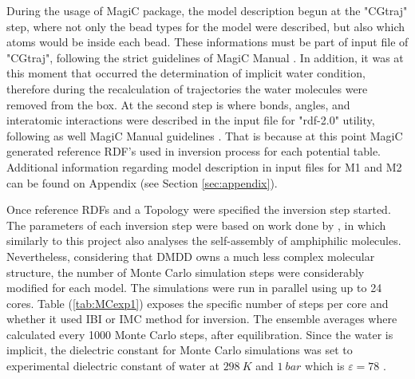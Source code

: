 \documentclass[10pt,a4paper,twoside]{article}
\begin{document}
 During the usage of MagiC package, the model description begun at the "CGtraj" step, where  not only the bead types for the model were described, but also which atoms would be inside each bead. These informations must be part of input file of "CGtraj", following the strict guidelines of MagiC Manual \cite{magicmanu}. In addition, it was at this moment that occurred the determination of implicit water condition, therefore during the recalculation of trajectories the water molecules were removed from the box. At the second step is where bonds, angles, and interatomic interactions were described in the input file for "rdf-2.0" utility, following as well MagiC Manual guidelines \cite{magicmanu}.  That is because at this point MagiC generated reference RDF's used in inversion process for each potential table. Additional information regarding model description in input files for M1 and M2 can be found on Appendix (see Section \ref{sec:appendix}).
 
 Once reference RDFs and a Topology were specified the inversion step started. The parameters of each inversion step were based on work done by , in which similarly to this project also analyses the self-assembly of amphiphilic molecules. Nevertheless, considering that DMDD owns a much less complex molecular structure, the number of Monte Carlo simulation steps were considerably modified for each model. The simulations were run in parallel using up to 24 cores. Table (\ref{tab:MCexp1}) exposes the specific number of steps per core and whether it used IBI or IMC method for inversion. The ensemble  averages where calculated every 1000 Monte Carlo steps, after equilibration. Since the water is implicit, the dielectric constant for Monte Carlo simulations was set to experimental dielectric constant of water at $298\ K$ and $1\ bar$ which is $\varepsilon = 78$ \cite{dconst}. 
 
\end{document}
